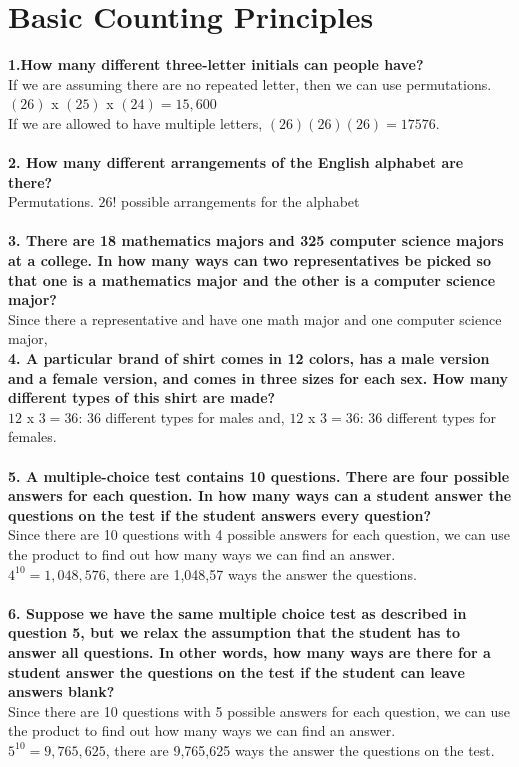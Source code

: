 \documentclass[11pt]{article}
\begin{document}
\section{Basic Counting Principles}
\textbf{1.How many different three-letter initials can people have?}\\
If we are assuming there are no repeated letter, then we can use permutations. $(26)$ x $(25)$ x $(24) = 15,600$\\
If we are allowed to have multiple letters, $(26)(26)(26)=17576$.\\
\\
\textbf{2. How many different arrangements of the English alphabet are there?}\\
Permutations. $26!$ possible arrangements for the alphabet\\
\\
\textbf{3. There are 18 mathematics majors and 325 computer science majors at a college. In how many ways can two representatives be picked so that one is a mathematics major and the other is a computer science major?}\\
Since there a representative and have one math major and one computer science major, \\
\textbf{4. A particular brand of shirt comes in 12 colors, has a male version and a female version, and comes in three sizes for each sex.  How many different types of this shirt are made?}\\
$12$ x $3=36$: 36 different types for males and, $12$ x $3=36$: 36 different types for females.\\
\\
\textbf{5. A multiple-choice test contains 10 questions.  There are four possible answers for each question.  In how many ways can a student answer the questions on the test if the student answers every question?}\\
Since there are 10 questions with 4 possible answers for each question, we can use the product to find out how many ways we can find an answer.\\
$4^{10}=1,048,576$, there are 1,048,57 ways the answer the questions.\\
\\
\textbf{6. Suppose we have the same multiple choice test as described in question 5, but we relax the assumption that the student has to answer all questions.  In other words, how many ways are there for a student answer the questions on the test if the student can leave answers blank?}\\
Since there are 10 questions with 5 possible answers for each question, we can use the product to find out how many ways we can find an answer.\\
$5^{10}=9,765,625$, there are 9,765,625 ways the answer the questions on the test.\\
\end{document}
